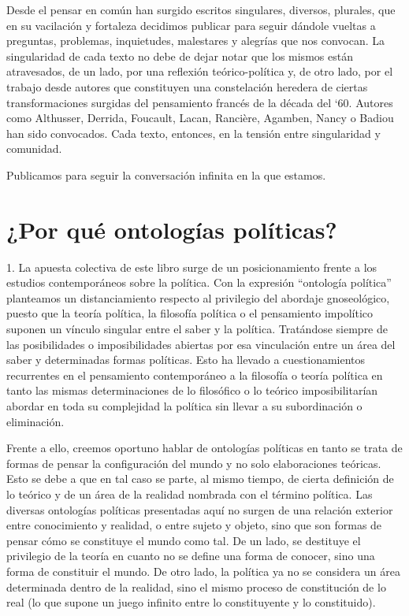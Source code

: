 Desde el pensar en común han surgido escritos singulares, diversos,
plurales, que en su vacilación y fortaleza decidimos publicar para
seguir dándole vueltas a preguntas, problemas, inquietudes, malestares y
alegrías que nos convocan. La singularidad de cada texto no debe de
dejar notar que los mismos están atravesados, de un lado, por una
reflexión teórico-política y, de otro lado, por el trabajo desde autores
que constituyen una constelación heredera de ciertas transformaciones
surgidas del pensamiento francés de la década del `60. Autores como
Althusser, Derrida, Foucault, Lacan, Rancière, Agamben, Nancy o Badiou
han sido convocados. Cada texto, entonces, en la tensión entre
singularidad y comunidad.

Publicamos para seguir la conversación infinita en la que estamos.

\section*{¿Por qué ontologías políticas?}

1. La apuesta colectiva de este libro surge de un posicionamiento frente a
los estudios contemporáneos sobre la política. Con la expresión
\enquote{ontología política} planteamos un distanciamiento respecto al
privilegio del abordaje gnoseológico, puesto que la teoría política, la
filosofía política o el pensamiento impolítico suponen un vínculo
singular entre el saber y la política. Tratándose siempre de las
posibilidades o imposibilidades abiertas por esa vinculación entre un
área del saber y determinadas formas políticas. Esto ha llevado a
cuestionamientos recurrentes en el pensamiento contemporáneo a la
filosofía o teoría política en tanto las mismas determinaciones de lo
filosófico o lo teórico imposibilitarían abordar en toda su complejidad
la política sin llevar a su subordinación o eliminación.

Frente a ello, creemos oportuno hablar de ontologías políticas en tanto
se trata de formas de pensar la configuración del mundo y no solo
elaboraciones teóricas. Esto se debe a que en tal caso se parte, al
mismo tiempo, de cierta definición de lo teórico y de un área de la
realidad nombrada con el término política. Las diversas ontologías
políticas presentadas aquí no surgen de una relación exterior entre
conocimiento y realidad, o entre sujeto y objeto, sino que son formas de
pensar cómo se constituye el mundo como tal. De un lado, se destituye el
privilegio de la teoría en cuanto no se define una forma de conocer,
sino una forma de constituir el mundo. De otro lado, la política ya no
se considera un área determinada dentro de la realidad, sino el mismo
proceso de constitución de lo real (lo que supone un juego infinito
entre lo constituyente y lo constituido).

